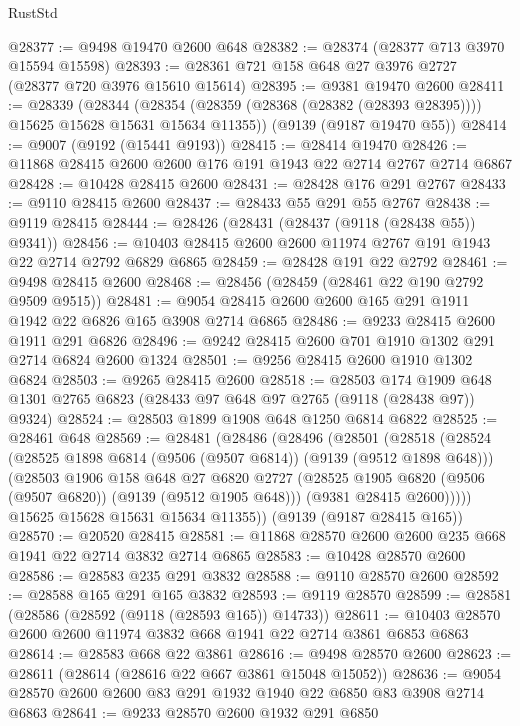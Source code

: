 \begin{lexlean}{RustStd}
\begin{coremodule}
@28377 := @9498 @19470 @2600 @648
@28382 := @28374 (@28377 @713 @3970 @15594 @15598)
@28393 := @28361 @721 @158 @648 @27 @3976 @2727 (@28377 @720 @3976 @15610 @15614)
@28395 := @9381 @19470 @2600
@28411 := @28339
    (@28344 (@28354 (@28359 (@28368 (@28382 (@28393 @28395)))) @15625 @15628 @15631 @15634 @11355))
    (@9139 (@9187 @19470 @55))
@28414 := @9007 (@9192 (@15441 @9193))
@28415 := @28414 @19470
@28426 := @11868 @28415 @2600 @2600 @176 @191 @1943 @22 @2714 @2767 @2714 @6867
@28428 := @10428 @28415 @2600
@28431 := @28428 @176 @291 @2767
@28433 := @9110 @28415 @2600
@28437 := @28433 @55 @291 @55 @2767
@28438 := @9119 @28415
@28444 := @28426 (@28431 (@28437 (@9118 (@28438 @55)) @9341))
@28456 := @10403 @28415 @2600 @2600 @11974 @2767 @191 @1943 @22 @2714 @2792 @6829 @6865
@28459 := @28428 @191 @22 @2792
@28461 := @9498 @28415 @2600
@28468 := @28456 (@28459 (@28461 @22 @190 @2792 @9509 @9515))
@28481 := @9054 @28415 @2600 @2600 @165 @291 @1911 @1942 @22 @6826 @165 @3908 @2714 @6865
@28486 := @9233 @28415 @2600 @1911 @291 @6826
@28496 := @9242 @28415 @2600 @701 @1910 @1302 @291 @2714 @6824 @2600 @1324
@28501 := @9256 @28415 @2600 @1910 @1302 @6824
@28503 := @9265 @28415 @2600
@28518 := @28503
    @174
    @1909
    @648
    @1301
    @2765
    @6823
    (@28433 @97 @648 @97 @2765 (@9118 (@28438 @97)) @9324)
@28524 := @28503 @1899 @1908 @648 @1250 @6814 @6822
@28525 := @28461 @648
@28569 := @28481
    (@28486
      (@28496
        (@28501
          (@28518
            (@28524
              (@28525 @1898 @6814 (@9506 (@9507 @6814)) (@9139 (@9512 @1898 @648)))
              (@28503
                @1906
                @158
                @648
                @27
                @6820
                @2727
                (@28525 @1905 @6820 (@9506 (@9507 @6820)) (@9139 (@9512 @1905 @648)))
                (@9381 @28415 @2600)))))
        @15625
        @15628
        @15631
        @15634
        @11355))
    (@9139 (@9187 @28415 @165))
@28570 := @20520 @28415
@28581 := @11868 @28570 @2600 @2600 @235 @668 @1941 @22 @2714 @3832 @2714 @6865
@28583 := @10428 @28570 @2600
@28586 := @28583 @235 @291 @3832
@28588 := @9110 @28570 @2600
@28592 := @28588 @165 @291 @165 @3832
@28593 := @9119 @28570
@28599 := @28581 (@28586 (@28592 (@9118 (@28593 @165)) @14733))
@28611 := @10403 @28570 @2600 @2600 @11974 @3832 @668 @1941 @22 @2714 @3861 @6853 @6863
@28614 := @28583 @668 @22 @3861
@28616 := @9498 @28570 @2600
@28623 := @28611 (@28614 (@28616 @22 @667 @3861 @15048 @15052))
@28636 := @9054 @28570 @2600 @2600 @83 @291 @1932 @1940 @22 @6850 @83 @3908 @2714 @6863
@28641 := @9233 @28570 @2600 @1932 @291 @6850

\end{coremodule}
\end{lexlean}

